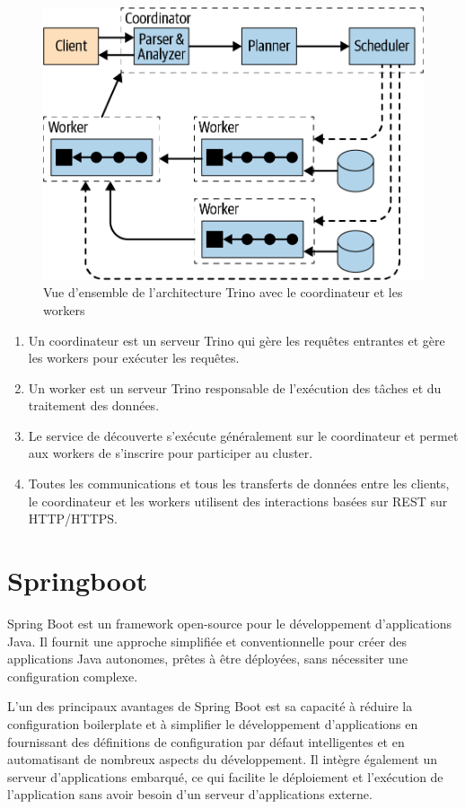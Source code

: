 \cite{trino}

\begin{figure}[H]
\centering
\includegraphics[width=0.8\linewidth]{images/trino_architecture.png}
\caption{Vue d'ensemble de l'architecture Trino avec le coordinateur et les workers}\label{fig:trino-architecture}
\end{figure}

\begin{enumerate}
	\item Un coordinateur est un serveur Trino qui gère les requêtes entrantes et gère les workers pour exécuter les requêtes.
	\item Un worker est un serveur Trino responsable de l'exécution des tâches et du traitement des données.
	\item Le service de découverte s'exécute généralement sur le coordinateur et permet aux workers de s'inscrire pour participer au cluster.
	\item Toutes les communications et tous les transferts de données entre les clients, le coordinateur et les workers utilisent des interactions basées sur REST sur HTTP/HTTPS.
\end{enumerate}


\section{Springboot}

Spring Boot est un framework open-source pour le développement d'applications Java. Il fournit une approche simplifiée et conventionnelle pour créer des applications Java autonomes, prêtes à être déployées, sans nécessiter une configuration complexe.

L'un des principaux avantages de Spring Boot est sa capacité à réduire la configuration boilerplate et à simplifier le développement d'applications en fournissant des définitions de configuration par défaut intelligentes et en automatisant de nombreux aspects du développement. Il intègre également un serveur d'applications embarqué, ce qui facilite le déploiement et l'exécution de l'application sans avoir besoin d'un serveur d'applications externe.

